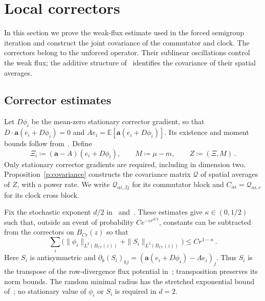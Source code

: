 \documentclass[11pt]{amsart}
\theoremstyle{definition}
\theoremstyle{remark}
\numberwithin{equation}{section}
\newcommand{\E}{\mathbb E}
\renewcommand{\a}{\mathbf a}
\begin{document}
\section{Local correctors}\label{sec.correctors}\label{s:covariance}

In this section we prove the weak-flux estimate used in the forced semigroup iteration and construct the joint covariance of the commutator and clock. The correctors belong to the unforced operator. Their sublinear oscillations control the weak flux; the additive structure of~\citet[Theorem~4.6]{AKM2019book} identifies the covariance of their spatial averages.

\subsection{Corrector estimates}\label{ss.corrector-estimates}

Let $D\phi_i$ be the mean-zero stationary corrector gradient, so that $D\cdot\a(e_i+D\phi_i)=0$ and $Ae_i=\E[\a(e_i+D\phi_i)]$. Its existence and moment bounds follow from~\citet[Theorem~4.1]{AKM2019book}. Define
\begin{equation}\label{e:commutator}
 \Xi_i\coloneqq(\a-A)(e_i+D\phi_i),\qquad M\coloneqq\mu-m,\qquad Z\coloneqq(\Xi,M)\, .
\end{equation}
Only stationary corrector gradients are required, including in dimension two. Proposition~\ref{p:covariance} constructs the covariance matrix $\mathcal Q$ of spatial averages of $Z$, with a power rate. We write $\mathscr Q_{\alpha i,\beta j}$ for its commutator block and $C_{\alpha i}=\mathcal Q_{\alpha i,c}$ for its clock cross block.


Fix the stochastic exponent $d/2$ in~\citet[Lemma~3.17]{AKM2019book} and~\citet[Proposition~6.2]{AKM2019book}. These estimates give $\kappa\in(0,1/2)$ such that, outside an event of probability $Ce^{-cr^{d/2}}$, constants can be subtracted from the correctors on $B_{Cr}(z)$ so that
\begin{equation}\label{e:sublinear-pair}
 \sum_i\bigl(\|\phi_i\|_{\underline L^2(B_{Cr}(z))}
              +\|S_i\|_{\underline L^2(B_{Cr}(z))}\bigr)
 \leq Cr^{1-\kappa}\, .
\end{equation}
Here $S_i$ is antisymmetric and $\partial_k(S_i)_{kj}=(\a(e_i+D\phi_i)-Ae_i)_j$. Thus $S_i$ is the transpose of the row-divergence flux potential in~\citet[(6.6)]{AKM2019book}; transposition preserves its norm bounds. The random minimal radius has the stretched exponential bound of~\citet[(3.39)]{AKM2019book}; no stationary value of $\phi_i$ or $S_i$ is required in $d=2$.
\end{document}
